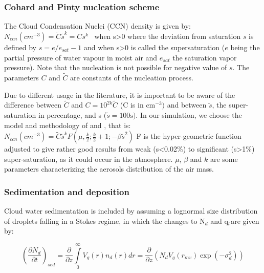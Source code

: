 \subsubsection{Cohard and Pinty nucleation scheme}

The Cloud Condensation Nuclei (CCN) density is given by:
\newline
$N_{ccn}\left( {cm}^{-3} \right)=\tilde{C}\tilde{s}^{k}=Cs^{k}\, \, \, \, \,
$when s\textgreater 0
\newline
where the deviation from saturation $s$ is defined by $s = e/e_{sat} -1$ and
\newline
when s\textgreater 0 is called the supersaturation ($e$ being the partial
pressure of water vapour in moist air and $e_{sat}$ the saturation vapor
pressure). Note that the nucleation is not possible for negative value of $s$.
The parameters $C$ and $\tilde{C}$ are constants of the nucleation
process.

Due to different usage in the literature, it is important to be aware of the
difference between $\tilde{C}$ and $C=10^{2k}\tilde{C}$ (C is in cm$^{-3})$ and
between $\tilde{s}$, the super-saturation in percentage, and s
($\tilde{s}=100\mbox{s})$.
\newline
\newline
In our simulation, we choose the model and methodology of
\cite{Cohard:1998} and \cite{Cohard:2000}, that is: $N_{ccn}\left(
{cm}^{-3} \right)=\tilde{C}\tilde{s}^{k}F\left( \mu
,\frac{k}{2};\frac{k}{2}+1;-\beta \tilde{s}^{2} \right)$
\newline
F is the hyper-geometric function adjusted to give rather good results from
weak (s\textless 0.02{\%}) to significant (s\textgreater 1{\%})
super-saturation, as it could occur in the atmosphere. $\mu$, $\beta $ and $k$ are
some parameters characterizing the aerosols distribution of the air mass.

\subsubsection{ Sedimentation and deposition}
Cloud water sedimentation is included by assuming a lognormal size
distribution of droplets falling in a Stokes regime, in which the changes to
N$_{d}$ and q$_{l\, }$are given by:

\begin{equation}
\left( \frac{\partial N_{d}}{\partial t} \right)_{sed}=\frac{\partial
}{\partial z}\int\limits_0^\infty {V_{g}\left( r \right)n_{d}\left( r
\right)dr} =\frac{\partial }{\partial z}\left( N_{d}V_{g}\left( r_{mv}
\right)\exp \left( -\sigma_{d}^{2} \right) \right)
\end{equation}

